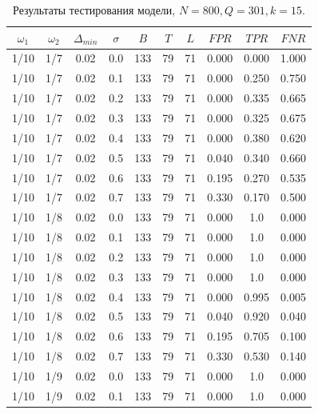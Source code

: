 \documentclass[specialist, substylefile = spbu.rtx,
			   subf, href, 12pt]{disser}
\begin{document}
\begin{table}[!hhh]
	\center
	\caption{Результаты тестирования модели, $ N = 800, Q=301, k=15 $.}
	\begin{tabular}{cccccccccc}
		\toprule
		$ \omega_1 $ & $ \omega_2 $ & $ \Delta_{min} $ & $ \sigma $ &    $ B $ &   $ T $ &   $ L $ &    $ FPR $ &    $ TPR $ &    $ FNR $ \\
		\midrule
		1/10&     1/7 &        0.02 &     0.0 & 133 & 79 & 71 & 0.000 & 0.000 & 1.000 \\
		1/10&     1/7 &        0.02 &     0.1 & 133 & 79 & 71 & 0.000 & 0.250 & 0.750 \\
		1/10&     1/7 &        0.02 &     0.2 & 133 & 79 & 71 & 0.000 & 0.335 & 0.665 \\
		1/10&     1/7 &        0.02 &     0.3 & 133 & 79 & 71 & 0.000 & 0.325 & 0.675 \\
		1/10&     1/7 &        0.02 &     0.4 & 133 & 79 & 71 & 0.000 & 0.380 & 0.620 \\
		1/10&     1/7 &        0.02 &     0.5 & 133 & 79 & 71 & 0.040 & 0.340 & 0.660 \\
		1/10&     1/7 &        0.02 &     0.6 & 133 & 79 & 71 & 0.195 & 0.270 & 0.535 \\
		1/10&     1/7 &        0.02 &     0.7 & 133 & 79 & 71 & 0.330 & 0.170 & 0.500 \\
		\hline
		1/10&     1/8 &        0.02 &     0.0 & 133 & 79 & 71 & 0.000 & 1.0 & 0.000 \\
		1/10&     1/8 &        0.02 &     0.1 & 133 & 79 & 71 & 0.000 & 1.0 & 0.000 \\
		1/10&     1/8 &        0.02 &     0.2 & 133 & 79 & 71 & 0.000 & 1.0 & 0.000 \\
		1/10&     1/8 &        0.02 &     0.3 & 133 & 79 & 71 & 0.000 & 1.0 & 0.000 \\
		1/10&     1/8 &        0.02 &     0.4 & 133 & 79 & 71 & 0.000 & 0.995 & 0.005 \\
		1/10&     1/8 &        0.02 &     0.5 & 133 & 79 & 71 & 0.040 & 0.920 & 0.040 \\
		1/10&     1/8 &        0.02 &     0.6 & 133 & 79 & 71 & 0.195 & 0.705 & 0.100 \\
		1/10&     1/8 &        0.02 &     0.7 & 133 & 79 & 71 & 0.330 & 0.530 & 0.140 \\
		\hline
		1/10 &     1/9 &        0.02 &     0.0 & 133 & 79 & 71 & 0.000 & 1.0 & 0.000 \\
		1/10 &     1/9 &        0.02 &     0.1 & 133 & 79 & 71 & 0.000 & 1.0 & 0.000 \\

\end{tabular}
\end{table}
\end{document}
